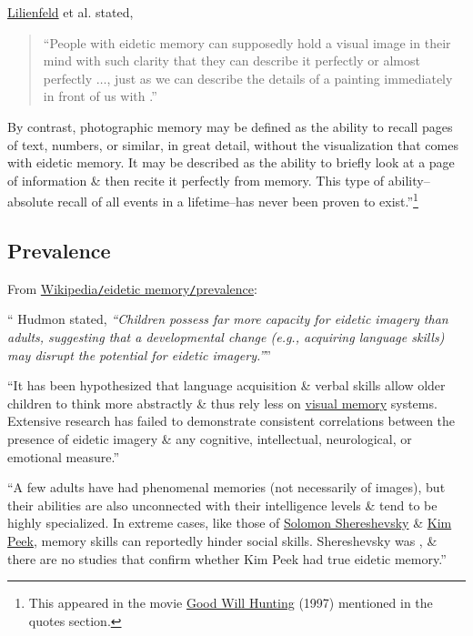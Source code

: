 \documentclass[oneside]{book}
\numberwithin{equation}{section}
\begin{document}
\href{https://en.wikipedia.org/wiki/Scott_Lilienfeld}{Lilienfeld} et al. stated,
\begin{quotation}
	``People with eidetic memory can supposedly hold a visual image in their mind with such clarity that they can describe it perfectly or almost perfectly $\ldots$, just as we can describe the details of a painting immediately in front of us with .''
\end{quotation}
By contrast, photographic memory may be defined as the ability to recall pages of text, numbers, or similar, in great detail, without the visualization that comes with eidetic memory. It may be described as the ability to briefly look at a page of information \& then recite it perfectly from memory. This type of ability--absolute recall of all events in a lifetime--has never been proven to exist.''\footnote{This appeared in the movie \href{https://www.imdb.com/title/tt0119217/}{Good Will Hunting} (1997) mentioned in the quotes section.}

\subsection{Prevalence}
From \href{https://en.wikipedia.org/wiki/Eidetic_memory#Prevalence}{Wikipedia\texttt{/}eidetic memory\texttt{/}prevalence}:

`` Hudmon stated, \textit{``Children possess far more capacity for eidetic imagery than adults, suggesting that a developmental change (e.g., acquiring language skills) may disrupt the potential for eidetic imagery.''}''

``It has been hypothesized that language acquisition \& verbal skills allow older children to think more abstractly \& thus rely less on \href{https://en.wikipedia.org/wiki/Visual_memory}{visual memory} systems. Extensive research has failed to demonstrate consistent correlations between the presence of eidetic imagery \& any cognitive, intellectual, neurological, or emotional measure.''

``A few adults have had phenomenal memories (not necessarily of images), but their abilities are also unconnected with their intelligence levels \& tend to be highly specialized. In extreme cases, like those of \href{https://en.wikipedia.org/wiki/Solomon_Shereshevsky}{Solomon Shereshevsky} \& \href{https://en.wikipedia.org/wiki/Kim_Peek}{Kim Peek}, memory skills can reportedly hinder social skills. Shereshevsky was , \& there are no studies that confirm whether Kim Peek had true eidetic memory.''
\end{document}

